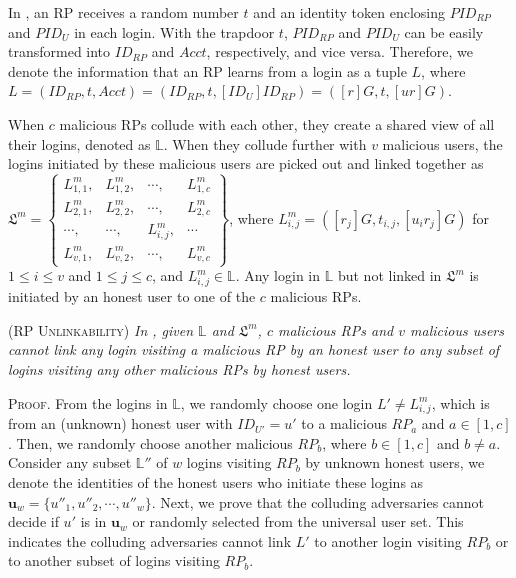 In \usso, an RP receives a random number $t$ and an identity token enclosing $PID_{RP}$ and $PID_U$ in each login. %
With the trapdoor $t$, $PID_{RP}$ and $PID_U$ can be easily transformed into $ID_{RP}$ and $Acct$, respectively, and vice versa. Therefore, we denote the information that an RP learns from a login as a tuple $L$, where $L =(ID_{RP}, t, Acct)=(ID_{RP}, t, [ID_{U}]ID_{RP})=([r]G, t, [ur]G)$.



When $c$ malicious RPs collude with each other, they create a shared view of all their logins, denoted as $\mathbb{L}$.
When they collude further with $v$ malicious users, the logins initiated by these malicious users are picked out and linked together as
$\mathfrak{L}^m=\left \{ \begin{matrix}
L^m_{1,1},&L^m_{1,2},&\cdots,&L^m_{1,c}\\
L^m_{2,1},& L^m_{2,2},&\cdots,&L^m_{2,c}\\
\cdots,&\cdots,&L^m_{i,j},&\cdots\\
L^m_{v,1},&L^m_{v,2},&\cdots,&L^m_{v,c}
\end{matrix}\right\}$,
where $L^m_{i, j}=([r_j]G, t_{i,j}, [u_ir_j]G)$ for $1 \le i \le v$ and $1 \le j \le c$, and $L^m_{i,j} \in \mathbb{L}$. Any login in $\mathbb{L}$ but not linked in $\mathfrak{L}^m$ is initiated by an honest user to one of the $c$ malicious RPs.


\begin{thm}
\textsc{(RP Unlinkability)} \emph{In \usso, given $\mathbb{L}$ and $\mathfrak{L}^m$, $c$ malicious RPs and $v$ malicious users cannot link any login visiting a malicious RP by an honest user to any subset of logins visiting any other malicious RPs by honest users.}
\end{thm}


\noindent\textsc{Proof.} From the logins in $\mathbb{L}$,
 we randomly choose one login $L' \neq L^m_{i,j}$,
 which is from an (unknown) honest user with $ID_{U'}=u'$ to a malicious $RP_a$ and $a \in [1,c]$.
Then, we randomly choose another malicious $RP_b$, where $b \in [1,c]$ and $b \neq a$.
Consider any subset $\mathbb{L}''$ of $w$ logins visiting $RP_b$ by unknown honest users,
 we denote the identities of the honest users who initiate these logins as $\mathbf{u}_w=\{{u''_1}, {u''_2}, \cdots, {u''_w}\}$.
Next, we prove that the colluding adversaries cannot decide if $u'$ is in $\mathbf{u}_w$ or randomly selected from the universal user set.
This indicates the colluding adversaries cannot link $L'$ to another login visiting $RP_b$
    or to another subset of logins visiting $RP_b$.

